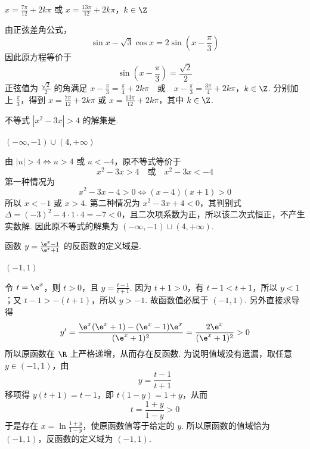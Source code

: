\begin{answer}
\(x = \frac{7\pi}{12} + 2k\pi\) 或 \(x = \frac{13\pi}{12} + 2k\pi\)，\(k \in \Z\)
\end{answer}

\begin{solution}
由正弦差角公式，
\[
\sin x-\sqrt3\cos x=2\sin\left(x-\frac{\pi}{3}\right)
\]
因此原方程等价于
\[
\sin\left(x-\frac\pi3\right)=\frac{\sqrt2}{2}
\]
正弦值为 \(\frac{\sqrt2}{2}\) 的角满足
\(x-\frac{\pi}{3}=\frac{\pi}{4}+2k\pi\quad\text{或}\quad x-\frac{\pi}{3}=\frac{3\pi}{4}+2k\pi\)，\(k\in\Z\).
分别加上 \(\frac{\pi}{3}\)，得到 \(x=\frac{7\pi}{12}+2k\pi\) 或 \(x=\frac{13\pi}{12}+2k\pi\)，其中 \(k\in\Z\).
\end{solution}

\begin{problem}
不等式 \(|x^2 - 3x| > 4\) 的解集是\fillinblank{}.
\end{problem}

\begin{answer}
\((-\infty,-1) \cup (4,+\infty)\)
\end{answer}

\begin{solution}
由 \(|u|>4\iff u>4\) 或 \(u<-4\)，原不等式等价于
\[
x^2-3x>4\quad\text{或}\quad x^2-3x<-4
\]
第一种情况为
\[
x^2-3x-4>0\iff (x-4)(x+1)>0
\]
所以 \(x<-1\) 或 \(x>4\). 第二种情况为 \(x^2-3x+4<0\)，其判别式 \(\Delta=(-3)^2-4\cdot1\cdot4=-7<0\)，且二次项系数为正，所以该二次式恒正，不产生实数解. 因此原不等式的解集为 \((-\infty,-1)\cup(4,+\infty)\).
\end{solution}

\begin{problem}
函数 \(y = \frac{\e^x - 1}{\e^x + 1}\) 的反函数的定义域是\fillinblank{}.
\end{problem}

\begin{answer}
\((-1,1)\)
\end{answer}

\begin{solution}
令 \(t=\e^x\)，则 \(t>0\)，且 \(y=\frac{t-1}{t+1}\). 因为 \(t+1>0\)，有 \(t-1<t+1\)，所以 \(y<1\)；又 \(t-1>-(t+1)\)，所以 \(y>-1\). 故函数值必属于 \((-1,1)\). 另外直接求导得
\[
y'=\frac{\e^x(\e^x+1)-(\e^x-1)\e^x}{(\e^x+1)^2}=\frac{2\e^x}{(\e^x+1)^2}>0
\]
所以原函数在 \(\R\) 上严格递增，从而存在反函数. 为说明值域没有遗漏，取任意 \(y\in(-1,1)\)，由
\[
y=\frac{t-1}{t+1}
\]
移项得 \(y(t+1)=t-1\)，即 \(t(1-y)=1+y\)，从而
\[
t=\frac{1+y}{1-y}>0
\]
于是存在 \(x=\ln\frac{1+y}{1-y}\)，使原函数值等于给定的 \(y\). 所以原函数的值域恰为 \((-1,1)\)，反函数的定义域为 \((-1,1)\).
\end{solution}

